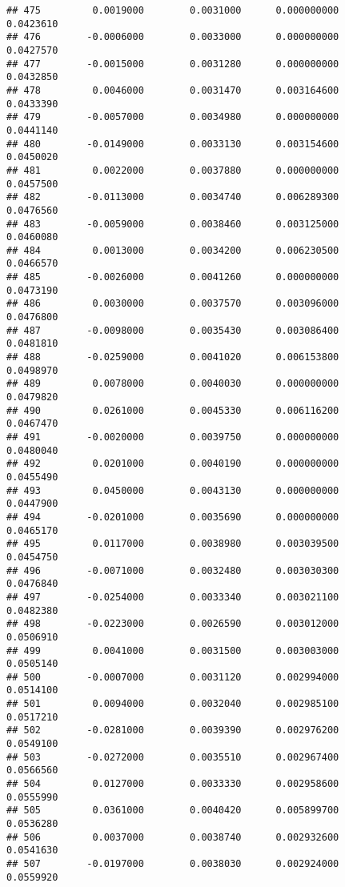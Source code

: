 \documentclass[
]{article}
\begin{document}
\begin{verbatim}
## 475         0.0019000        0.0031000      0.000000000             0.0423610
## 476        -0.0006000        0.0033000      0.000000000             0.0427570
## 477        -0.0015000        0.0031280      0.000000000             0.0432850
## 478         0.0046000        0.0031470      0.003164600             0.0433390
## 479        -0.0057000        0.0034980      0.000000000             0.0441140
## 480        -0.0149000        0.0033130      0.003154600             0.0450020
## 481         0.0022000        0.0037880      0.000000000             0.0457500
## 482        -0.0113000        0.0034740      0.006289300             0.0476560
## 483        -0.0059000        0.0038460      0.003125000             0.0460080
## 484         0.0013000        0.0034200      0.006230500             0.0466570
## 485        -0.0026000        0.0041260      0.000000000             0.0473190
## 486         0.0030000        0.0037570      0.003096000             0.0476800
## 487        -0.0098000        0.0035430      0.003086400             0.0481810
## 488        -0.0259000        0.0041020      0.006153800             0.0498970
## 489         0.0078000        0.0040030      0.000000000             0.0479820
## 490         0.0261000        0.0045330      0.006116200             0.0467470
## 491        -0.0020000        0.0039750      0.000000000             0.0480040
## 492         0.0201000        0.0040190      0.000000000             0.0455490
## 493         0.0450000        0.0043130      0.000000000             0.0447900
## 494        -0.0201000        0.0035690      0.000000000             0.0465170
## 495         0.0117000        0.0038980      0.003039500             0.0454750
## 496        -0.0071000        0.0032480      0.003030300             0.0476840
## 497        -0.0254000        0.0033340      0.003021100             0.0482380
## 498        -0.0223000        0.0026590      0.003012000             0.0506910
## 499         0.0041000        0.0031500      0.003003000             0.0505140
## 500        -0.0007000        0.0031120      0.002994000             0.0514100
## 501         0.0094000        0.0032040      0.002985100             0.0517210
## 502        -0.0281000        0.0039390      0.002976200             0.0549100
## 503        -0.0272000        0.0035510      0.002967400             0.0566560
## 504         0.0127000        0.0033330      0.002958600             0.0555990
## 505         0.0361000        0.0040420      0.005899700             0.0536280
## 506         0.0037000        0.0038740      0.002932600             0.0541630
## 507        -0.0197000        0.0038030      0.002924000             0.0559920

\end{verbatim}
\end{document}
